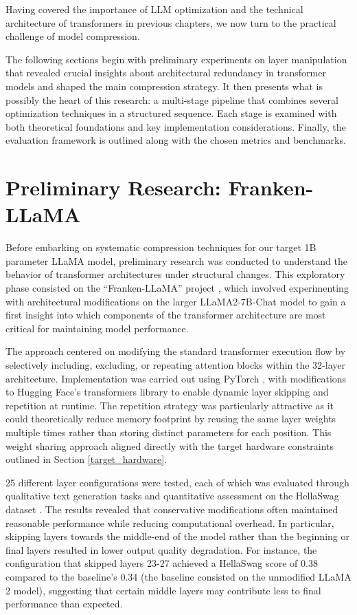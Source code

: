 Having covered the importance of LLM optimization and the technical architecture of transformers in previous chapters, we now turn to the practical challenge of model compression.

The following sections begin with preliminary experiments on layer manipulation that revealed crucial insights about architectural redundancy in transformer models and shaped the main compression strategy. It then presents what is possibly the heart of this research: a multi-stage pipeline that combines several optimization techniques in a structured sequence. Each stage is examined with both theoretical foundations and key implementation considerations. Finally, the evaluation framework is outlined along with the chosen metrics and benchmarks.

\section{Preliminary Research: Franken-LLaMA} \label{frankenllama}

Before embarking on systematic compression techniques for our target 1B parameter LLaMA model, preliminary research was conducted to understand the behavior of transformer architectures under structural changes. This exploratory phase consisted on the ``Franken-LLaMA'' project \cite{franken-llama}, which involved experimenting with architectural modifications on the larger LLaMA2-7B-Chat model \cite{llama2} to gain a first insight into which components of the transformer architecture are most critical for maintaining model performance.

The approach centered on modifying the standard transformer execution flow by selectively including, excluding, or repeating attention blocks within the 32-layer architecture. Implementation was carried out using PyTorch \cite{pytorch}, with modifications to Hugging Face's transformers library \cite{hf_transformers} to enable dynamic layer skipping and repetition at runtime. The repetition strategy was particularly attractive as it could theoretically reduce memory footprint by reusing the same layer weights multiple times rather than storing distinct parameters for each position. This weight sharing approach aligned directly with the target hardware constraints outlined in Section \ref{target_hardware}.

25 different layer configurations were tested, each of which was evaluated through qualitative text generation tasks and quantitative assessment on the HellaSwag dataset \cite{hellaswag}.
The results revealed that conservative modifications often maintained reasonable performance while reducing computational overhead. In particular, skipping layers towards the middle-end of the model rather than the beginning or final layers resulted in lower output quality degradation. For instance, the configuration that skipped layers 23-27 achieved a HellaSwag score of 0.38 compared to the baseline's 0.34 (the baseline consisted on the unmodified LLaMA 2 model), suggesting that certain middle layers may contribute less to final performance than expected.

